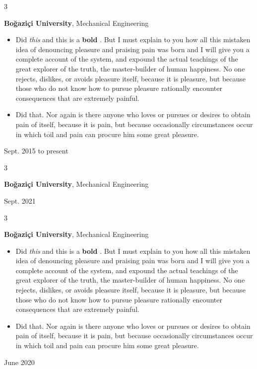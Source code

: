 \documentclass[10pt, letterpaper]{article}
\newenvironment{highlights}{
    \begin{itemize}[
        topsep=0.10 cm,
        parsep=0.10 cm,
        partopsep=0pt,
        itemsep=0pt,
        leftmargin=0.4 cm + 10pt
    ]
}{
    \end{itemize}
} %
\newenvironment{threecolentry}[3][]{
    \onecolentry
    \def\thirdColumn{#3}
    \setcolumnwidth{1 cm, \fill, 4.5 cm}
    \begin{paracol}{3}
    {\raggedright #2} \switchcolumn
}{
    \switchcolumn \raggedleft \thirdColumn
    \end{paracol}
    \endonecolentry
} %
\let\hrefWithoutArrow\href
\renewcommand{\href}[2]{\hrefWithoutArrow{#1}{\mbox{\ifthenelse{\equal{#2}{}}{ }{#2 }\raisebox{.15ex}{\footnotesize \faExternalLink*}}}}
\begin{document}
        \vspace{0.2 cm}

        \begin{threecolentry}{\textbf{}}{
            Sept. 2015 to present
        }
            \textbf{Boğaziçi University}, Mechanical Engineering
            \begin{highlights}
                \item Did \textit{this} and this is a \textbf{bold} \href{https://example.com}{link}. But I must explain to you how all this mistaken idea of denouncing pleasure and praising pain was born and I will give you a complete account of the system, and expound the actual teachings of the great explorer of the truth, the master-builder of human happiness. No one rejects, dislikes, or avoids pleasure itself, because it is pleasure, but because those who do not know how to pursue pleasure rationally encounter consequences that are extremely painful.
                \item Did that. Nor again is there anyone who loves or pursues or desires to obtain pain of itself, because it is pain, but because occasionally circumstances occur in which toil and pain can procure him some great pleasure.
            \end{highlights}
        \end{threecolentry}

        \vspace{0.2 cm}

        \begin{threecolentry}{\textbf{}}{
            Sept. 2021
        }
            \textbf{Boğaziçi University}, Mechanical Engineering
        \end{threecolentry}

        \vspace{0.2 cm}

        \begin{threecolentry}{\textbf{}}{
            June 2020
        }
            \textbf{Boğaziçi University}, Mechanical Engineering
            \begin{highlights}
                \item Did \textit{this} and this is a \textbf{bold} \href{https://example.com}{link}. But I must explain to you how all this mistaken idea of denouncing pleasure and praising pain was born and I will give you a complete account of the system, and expound the actual teachings of the great explorer of the truth, the master-builder of human happiness. No one rejects, dislikes, or avoids pleasure itself, because it is pleasure, but because those who do not know how to pursue pleasure rationally encounter consequences that are extremely painful.
                \item Did that. Nor again is there anyone who loves or pursues or desires to obtain pain of itself, because it is pain, but because occasionally circumstances occur in which toil and pain can procure him some great pleasure.
            \end{highlights}
        \end{threecolentry}
\end{document}
